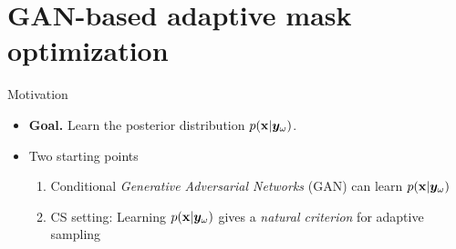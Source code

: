 


\section{GAN-based adaptive mask optimization}
\addtocounter{framenumber}{-1}


\begin{frame}[t]{Motivation}

    \begin{itemize}
        \item \textbf{Goal.} Learn the posterior distribution $p({\mathbf{x}}|{\bm{y}}_\omega)$.
        \vfill\item<3-> Two starting points 
        \begin{enumerate}
            \vfill\item Conditional \textit{Generative Adversarial Networks} (GAN) can learn $p({\mathbf{x}}|{\bm{y}}_\omega)$ \hfill \parencite{adler2018deep}\\
            \vfill{} 
            \vfill\item<5-> CS setting: Learning $p({\mathbf{x}}|{\bm{y}}_\omega)$ gives a \textit{natural criterion} for adaptive sampling \hfill \parencite{ji2008bayesian}\\
            \vfill{} 
        \end{enumerate}
        
        
    \end{itemize}
    \vfill
    

\end{frame}
